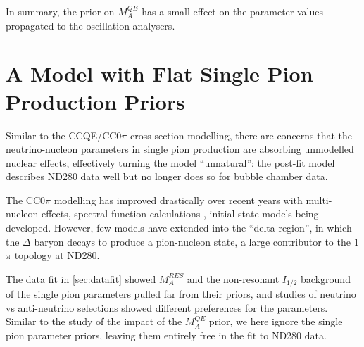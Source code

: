 In summary, the prior on $M_A^{QE}$ has a small effect on the parameter values propagated to the oscillation analysers.

\section{A Model with Flat Single Pion Production Priors}
Similar to the CCQE/CC0$\pi$ cross-section modelling, there are concerns that the neutrino-nucleon parameters in single pion production are absorbing unmodelled nuclear effects, effectively turning the model ``unnatural'': the post-fit model describes ND280 data well but no longer does so for bubble chamber data.

The CC0$\pi$ modelling has improved drastically over recent years with multi-nucleon effects\cite{nieves1,nieves2}, spectral function calculations \cite{benhar}, initial state models \cite{lfg} being developed. However, few models have extended into the ``delta-region'', in which the $\Delta$ baryon decays to produce a pion-nucleon state, a large contributor to the 1$\pi$ topology at ND280.

The data fit in \autoref{sec:datafit} showed $M_A^{RES}$ and the non-resonant $I_{1/2}$ background of the single pion parameters pulled far from their priors, and studies of neutrino vs anti-neutrino selections showed different preferences for the parameters. Similar to the study of the impact of the $M_A^{QE}$ prior, we here ignore the single pion parameter priors, leaving them entirely free in the fit to ND280 data.

